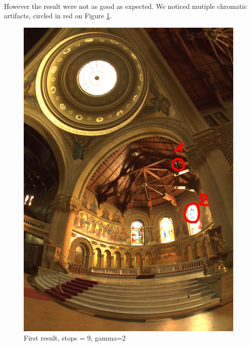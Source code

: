 \documentclass[a4paper,12pt,oneside,final]{report}
\begin{document}
\paragraph{}
However the result were not as good as expected. We noticed mutiple chromatic artifacts, circled in red on Figure \ref{img:res_raw}.
\begin{figure}[!h]
\centering
\includegraphics[scale=0.8]{pictures/raw_res.png}
\caption{First result, stops = $9$, gamma=$2$}
\label{img:res_raw}
\end{figure}
\cleardoublepage
\end{document}
